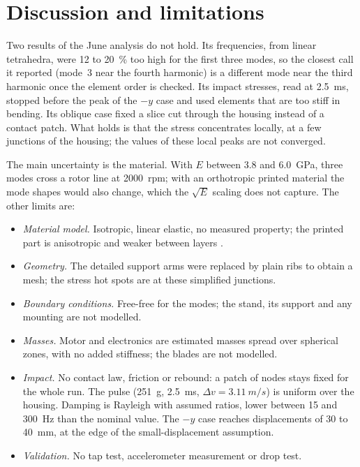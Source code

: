 \documentclass[11pt]{article}
\begin{document}
\section{Discussion and limitations}

Two results of the June analysis do not hold. Its frequencies, from linear tetrahedra, were 12 to \SI{20}{\%} too high
for the first three modes, so the closest call it reported (mode~3 near the fourth harmonic) is a different mode near the
third harmonic once the element order is checked. Its impact stresses, read at \SI{2.5}{ms}, stopped before the peak of the
$-y$ case and used elements that are too stiff in bending. Its oblique case fixed a slice cut through the housing instead of a
contact patch. What holds is that the stress concentrates locally, at a few junctions of the housing; the values of
these local peaks are not converged.

The main uncertainty is the material. With $E$ between 3.8 and \SI{6.0}{GPa}, three modes cross a rotor line at
\SI{2000}{rpm}; with an orthotropic printed material the mode shapes would also change, which the $\sqrt{E}$ scaling does
not capture. The other limits are:
\begin{itemize}
  \item \emph{Material model.} Isotropic, linear elastic, no measured property; the printed part is anisotropic and weaker
    between layers \citep{ahn2002,kohn2021}.
  \item \emph{Geometry.} The detailed support arms were replaced by plain ribs to obtain a mesh; the stress hot spots
    are at these simplified junctions.
  \item \emph{Boundary conditions.} Free-free for the modes; the stand, its support and any mounting are not modelled.
  \item \emph{Masses.} Motor and electronics are estimated masses spread over spherical zones, with no added stiffness;
    the blades are not modelled.
  \item \emph{Impact.} No contact law, friction or rebound: a patch of nodes stays fixed for the whole run. The pulse
    (\SI{251}{g}, \SI{2.5}{ms}, $\Delta v=\SI{3.11}{m/s}$) is uniform over the housing. Damping is Rayleigh with assumed
    ratios, lower between 15 and \SI{300}{Hz} than the nominal value. The $-y$ case reaches displacements of 30 to \SI{40}{mm}, at the edge of the small-displacement assumption.
  \item \emph{Validation.} No tap test, accelerometer measurement or drop test.
\end{itemize}
\end{document}
